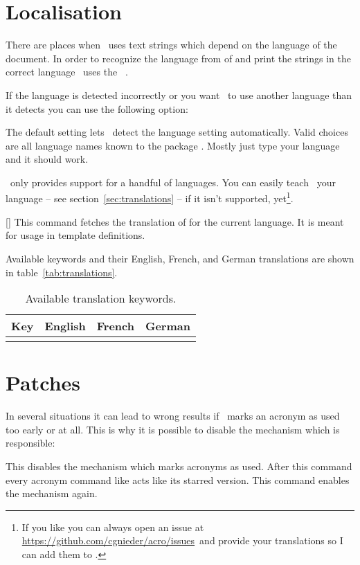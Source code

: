 \documentclass{acro-manual}
\newcommand*\issues{\url{https://github.com/cgnieder/acro/issues}}
\begin{document}
\section{Localisation}\label{sec:localisation}
There are places when \acro\ uses text strings which depend on the language of
the document.  In order to recognize the language from  of
 and print the strings in the correct language \acro\ uses
the ~\cite{pkg:translations}.

If the language is detected incorrectly or you want \acro\ to use another
language than it detects you can use the following option:
\begin{options}
    The default setting  lets \acro\ detect the language setting
    automatically. Valid choices are all language names known to the package
    . Mostly just type your language and it should work.
\end{options}
\acro\ only provides support for a handful of languages.  You can easily teach
\acro\ your language -- see section~\vref{sec:translations} -- if it isn't
supported, yet\footnote{If you like you can always open an issue at \issues\
  and provide your translations so I can add them to \acro.}.
\begin{commands}
  \expandable{}[]
    This command fetches the translation of  for the current
    language.  It is meant for usage in template definitions.
\end{commands}

Available keywords and their English, French, and German translations are
shown in table~\vref{tab:translations}.

\begin{table}
  \centering
  \begin{tabular}{llll}
    \toprule
      \bfseries Key & \bfseries English & \bfseries French & \bfseries German \\
    \midrule
      \translationtable
    \bottomrule
  \end{tabular}
  \caption{Available translation keywords.}
  \label{tab:translations}
\end{table}

\section{Patches}\label{sec:patches}
In several situations it can lead to wrong results if \acro\ marks an acronym
as used too early or at all.  This is why it is possible to disable the
mechanism which is responsible:
\begin{commands}
    This disables the mechanism which marks acronyms as used. After this
    command every acronym command like \cs{ac} acts like its starred version.
  \command{acswitchon}
    This command enables the mechanism again.
\end{commands}
\end{document}
